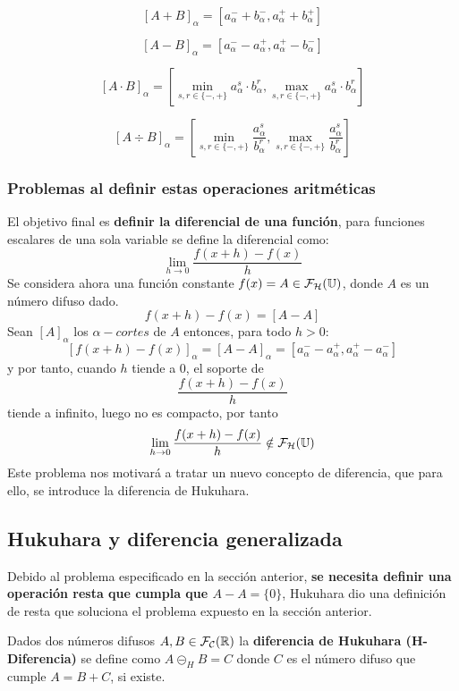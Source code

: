   $$
  [A+B]_\alpha = [a_\alpha^- + b_\alpha^-, a_\alpha^+ + b_\alpha^+]
  $$

  $$
  [A-B]_\alpha = [a_\alpha^- - a_\alpha^+, a_\alpha^+ - b_\alpha^-]
  $$

  $$
  [A \cdot B]_\alpha = \left[ \min_{s, r \in \{-, +\}} a_\alpha^s \cdot b_\alpha^r, \max_{s, r \in \{-, +\}} a_\alpha^s \cdot b_\alpha^r\right]
  $$

  $$
  [A \div B]_\alpha = \left[ \min_{s, r \in \{-, +\}} \frac{a_\alpha^s}{b_\alpha^r}, \max_{s, r \in \{-, +\}} \frac{a_\alpha^s}{b_\alpha^r}\right]
  $$

  \subsubsection{Problemas al definir estas operaciones aritméticas}
  El objetivo final es \textbf{definir la diferencial de una función}, para funciones escalares de una sola variable se define la diferencial como:
  $$
  \lim\limits_{h\rightarrow 0} \frac{f(x+h) - f(x)}{h}
  $$
  Se considera ahora una función constante $f(x)=A\in \mathcal{F}_\mathcal{H}(\mathbb U)$, donde $A$ es un número difuso dado. \\
  $$f(x+h) - f(x)=[A-A]$$
  Sean $[A]_\alpha$ los $\alpha-cortes$ de $A$ entonces, para todo $h>0$:
  $$
  \left[ f(x+h) - f(x)\right]_\alpha = [A-A]_\alpha = [a_\alpha^- - a_\alpha^+, a_\alpha^+ - a_\alpha^-]
  $$
  y por tanto, cuando $h$ tiende a $0$, el soporte de \[
	  \frac{f(x+h) - f(x)}{h}
  \]
  tiende a infinito, luego no es compacto, por tanto 
  \[
	\lim\limits_{h\rightarrow 0} \frac{f(x+h) - f(x)}{h} \notin \mathcal{F}_\mathcal{H}(\mathbb U)
  \]
  Este problema nos motivará a tratar un nuevo concepto de diferencia, que para ello, se introduce la diferencia de Hukuhara.
  \subsection{Hukuhara y diferencia generalizada} \label{def:hukukara}
  Debido al problema especificado en la sección anterior, \textbf{se necesita definir una operación resta que cumpla que $A-A=\{0\}$}, Hukuhara dio una definición de resta que soluciona el problema expuesto en la sección anterior.

  \begin{definicion}
    Dados dos números difusos $A, B \in \mathcal{F}_\mathcal{C}(\mathbb R)$ la \textbf{diferencia de Hukuhara (H-Diferencia)} se define como $A \circleddash_H B = C$ donde $C$ es el número difuso que cumple $A=B+C$, si existe.
  \end{definicion}

